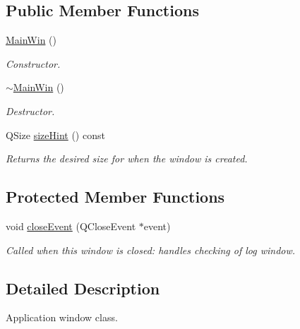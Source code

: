\subsection*{Public Member Functions}
\begin{DoxyCompactItemize}
\item 
\hypertarget{class_main_win_af05332e6fac4f7ab5c19b1a72aa7439d}{\hyperlink{class_main_win_af05332e6fac4f7ab5c19b1a72aa7439d}{Main\-Win} ()}\label{class_main_win_af05332e6fac4f7ab5c19b1a72aa7439d}

\begin{DoxyCompactList}\small\item\em Constructor. \end{DoxyCompactList}\item 
\hypertarget{class_main_win_a7068bb5ab02b75d4bbc78692388b9fb1}{\hyperlink{class_main_win_a7068bb5ab02b75d4bbc78692388b9fb1}{$\sim$\-Main\-Win} ()}\label{class_main_win_a7068bb5ab02b75d4bbc78692388b9fb1}

\begin{DoxyCompactList}\small\item\em Destructor. \end{DoxyCompactList}\item 
Q\-Size \hyperlink{class_main_win_af8f1854089c63efd6895ff536ad6ffc3}{size\-Hint} () const 
\begin{DoxyCompactList}\small\item\em Returns the desired size for when the window is created. \end{DoxyCompactList}\end{DoxyCompactItemize}
\subsection*{Protected Member Functions}
\begin{DoxyCompactItemize}
\item 
void \hyperlink{class_main_win_a06beabefe32c4e6514f76a07f1b63232}{close\-Event} (Q\-Close\-Event $\ast$event)
\begin{DoxyCompactList}\small\item\em Called when this window is closed\-: handles checking of log window. \end{DoxyCompactList}\end{DoxyCompactItemize}


\subsection{Detailed Description}
Application window class. 

